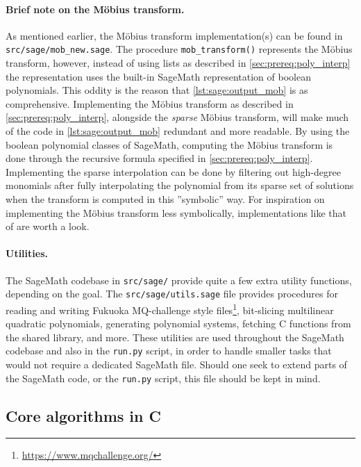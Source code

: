 \paragraph{Brief note on the Möbius transform.} As mentioned earlier, the Möbius transform implementation(s) can be found in \texttt{src/sage/mob\_new.sage}. The procedure \texttt{mob\_transform()} represents the Möbius transform, however, instead of using lists as described in \cref{sec:prereq:poly_interp} the representation uses the built-in SageMath representation of boolean polynomials. This oddity is the reason that \cref{lst:sage:output_mob} is as comprehensive. Implementing the Möbius transform as described in \cref{sec:prereq:poly_interp}, alongside the \textit{sparse} Möbius transform, will make much of the code in \cref{lst:sage:output_mob} redundant and more readable. By using the boolean polynomial classes of SageMath, computing the Möbius transform is done through the recursive formula specified in \cref{sec:prereq:poly_interp}. Implementing the sparse interpolation can be done by filtering out high-degree monomials after fully interpolating the polynomial from its sparse set of solutions when the transform is computed in this ''symbolic'' way. For inspiration on implementing the Möbius transform less symbolically, implementations like that of \cite{cryptoeprint:2022/1412} are worth a look.

\paragraph{Utilities.} The SageMath codebase in \texttt{src/sage/} provide quite a few extra utility functions, depending on the goal. The \texttt{src/sage/utils.sage} file provides procedures for reading and writing Fukuoka MQ-challenge style files\footnote{\url{https://www.mqchallenge.org/}}, bit-slicing multilinear quadratic polynomials, generating polynomial systems, fetching C functions from the shared library, and more. These utilities are used throughout the SageMath codebase and also in the \texttt{run.py} script, in order to handle smaller tasks that would not require a dedicated SageMath file. Should one seek to extend parts of the SageMath code, or the \texttt{run.py} script, this file should be kept in mind.

\subsection{Core algorithms in C} \label{sec:impl:c}

